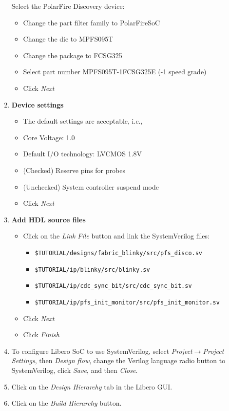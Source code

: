 \begin{enumerate}
Select the PolarFire Discovery device:
\begin{itemize}
\item Change the part filter family to PolarFireSoC
\item Change the die to MPFS095T
\item Change the package to FCSG325
\item Select part number MPFS095T-1FCSG325E (-1 speed grade)
\item Click \emph{Next}
\end{itemize}
%
\item \textbf{Device settings}
\begin{itemize}
\item The default settings are acceptable, i.e.,
\item Core Voltage: 1.0
\item Default I/O technology: LVCMOS 1.8V
\item (Checked) Reserve pins for probes
\item (Unchecked) System controller suspend mode
\item Click \emph{Next}
\end{itemize}
%
\newpage
\item \textbf{Add HDL source files}
\begin{itemize}
\item Click on the \emph{Link File} button and link the SystemVerilog files:
\begin{itemize}
\item \verb+$TUTORIAL/designs/fabric_blinky/src/pfs_disco.sv+
\item \verb+$TUTORIAL/ip/blinky/src/blinky.sv+
\item \verb+$TUTORIAL/ip/cdc_sync_bit/src/cdc_sync_bit.sv+
\item \verb+$TUTORIAL/ip/pfs_init_monitor/src/pfs_init_monitor.sv+
\end{itemize}
\item Click \emph{Next}
\item Click \emph{Finish}
\end{itemize}
%
\item To configure Libero SoC to use SystemVerilog, select
\emph{Project$\rightarrow$Project Settings}, then \emph{Design flow},
change the Verilog language radio button to SystemVerilog, click \emph{Save}, and
then \emph{Close}.
%
\item Click on the \emph{Design Hierarchy} tab in the Libero GUI.
\item Click on the \emph{Build Hierarchy} button.

\end{enumerate}

